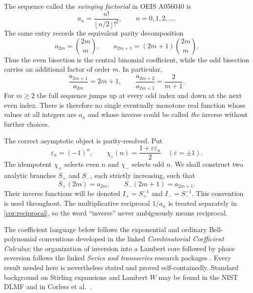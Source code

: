 \documentclass[11pt]{article}
\theoremstyle{definition}
\theoremstyle{remark}
\newcommand{\eps}{\varepsilon}
\newcommand{\floor}[1]{\left\lfloor #1\right\rfloor}
\begin{document}
The sequence called the \emph{swinging factorial} in OEIS A056040 \cite{OEIS} is
\begin{equation}\label{eq:def-an}
 a_n=\frac{n!}{\floor{n/2}!^2},\qquad n=0,1,2,\ldots.
\end{equation}
The same entry records the equivalent parity decomposition
\begin{equation}\label{eq:bisection-basic}
 a_{2m}=\binom{2m}{m},
 \qquad
 a_{2m+1}=(2m+1)\binom{2m}{m}.
\end{equation}
Thus the even bisection is the central binomial coefficient, while the odd bisection carries an additional factor of order $m$.  In particular,
\[
 \frac{a_{2m+1}}{a_{2m}}=2m+1,
 \qquad
 \frac{a_{2m+2}}{a_{2m+1}}=\frac{2}{m+1}.
\]
For $m\ge2$ the full sequence jumps up at every odd index and down at the next even index.  There is therefore no single eventually monotone real function whose values at all integers are $a_n$ and whose inverse could be called \emph{the} inverse without further choices.

The correct asymptotic object is parity-resolved.  Put
\begin{equation}\label{eq:epsn}
 \eps_n=(-1)^n,
 \qquad
 \chi_\eps(n)=\frac{1+\eps\eps_n}{2}\quad(\eps=\pm1).
\end{equation}
The idempotent $\chi_+$ selects even $n$ and $\chi_-$ selects odd $n$.  We shall construct two analytic branches $S_+$ and $S_-$, each strictly increasing, such that
\[
 S_+(2m)=a_{2m},\qquad S_-(2m+1)=a_{2m+1}.
\]
Their inverse functions will be denoted $I_+=S_+^{-1}$ and $I_-=S_-^{-1}$.  This convention is used throughout.  The multiplicative reciprocal $1/a_n$ is treated separately in \cref{cor:reciprocal}, so the word ``inverse'' never ambiguously means reciprocal.

The coefficient language below follows the exponential and ordinary Bell-polynomial conventions developed in the linked \emph{Combinatorial Coefficient Calculus}; the organization of inversion into a Lambert core followed by phase reversion follows the linked \emph{Series and transseries} research packages \cite{CoeffCalculus,SeriesTransseries}.  Every result needed here is nevertheless stated and proved self-containedly.  Standard background on Stirling expansions and Lambert $W$ may be found in the NIST DLMF and in Corless et al.\ \cite{DLMFGamma,DLMFBinet,DLMFW,Corless1996}.
\end{document}
